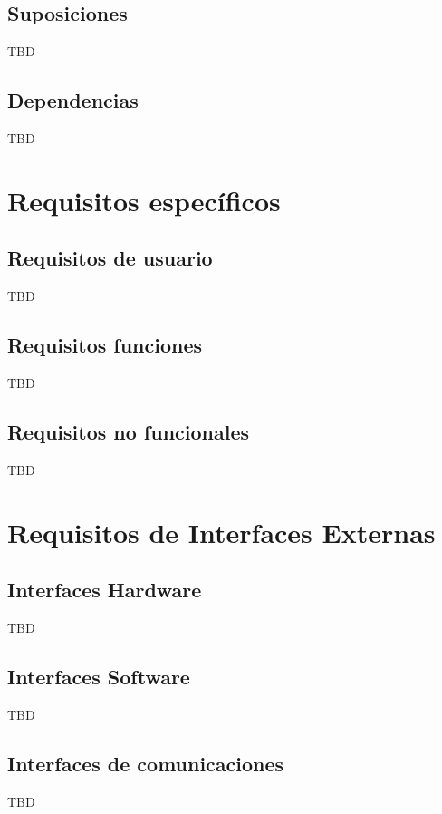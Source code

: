     \subsection{Suposiciones}
        TBD
        
    \subsection{Dependencias}
        TBD

\section{Requisitos específicos}

    \subsection{Requisitos de usuario}
        TBD
    
    \subsection{Requisitos funciones}
        TBD
    
    \subsection{Requisitos no funcionales}
        TBD

\section{Requisitos de Interfaces Externas}

    \subsection{Interfaces Hardware}
        TBD
    
    \subsection{Interfaces Software}
        TBD
    
    \subsection{Interfaces de comunicaciones}
        TBD

